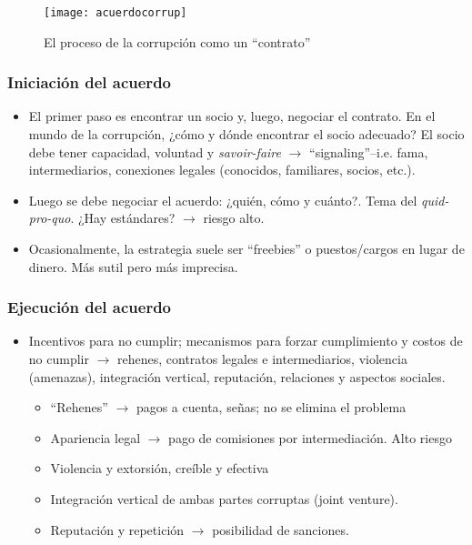 \documentclass[handout,final,xcolor=dvipsnames]{beamer}
\begin{document}
\begin{frame}
  \begin{figure}[htbp]
    \centering
    \texttt{[image: acuerdocorrup]}
    \caption{El proceso de la corrupción como un ``contrato''}
    \label{fig:corrupcioncpi}
  \end{figure}
\end{frame}

\begin{frame}\frametitle{Iniciación del acuerdo}
\begin{itemize}\itemsep 10pt
\item El primer paso es
encontrar un socio y, luego, negociar el contrato. En el mundo de la corrupción,
¿cómo y dónde encontrar el socio adecuado? El socio debe tener
capacidad, voluntad y \textit{savoir-faire} $\longrightarrow$
``signaling''--i.e. fama, intermediarios, conexiones legales
(conocidos, familiares, socios, etc.).  
\item  Luego se debe negociar el acuerdo: ¿quién, cómo y cuánto?. Tema
  del \textit{quid-pro-quo}. ¿Hay estándares? $\longrightarrow$ riesgo
  alto.
\item Ocasionalmente, la estrategia suele ser ``freebies'' o
  puestos/cargos en lugar de dinero. Más sutil pero más imprecisa. 
\end{itemize}
\end{frame}


\begin{frame}\frametitle{Ejecución del acuerdo}
\begin{itemize}\itemsep 10pt
\item Incentivos para no cumplir; mecanismos para forzar cumplimiento
  y costos de no cumplir $\longrightarrow$ rehenes, contratos legales
  e intermediarios, violencia (amenazas), integración vertical,
  reputación, relaciones y aspectos sociales. 
\begin{itemize}\itemsep 5pt
\item ``Rehenes'' $\longrightarrow$ pagos a cuenta, señas; no se
  elimina el problema
\item Apariencia legal $\longrightarrow$ pago de
  comisiones por intermediación. Alto riesgo
\item Violencia y extorsión, creíble y efectiva
\item Integración vertical de ambas partes corruptas (joint venture). 
\item Reputación y repetición $\longrightarrow$ posibilidad de
  sanciones. 
\end{itemize}
\end{itemize}
\end{frame}
\end{document}
